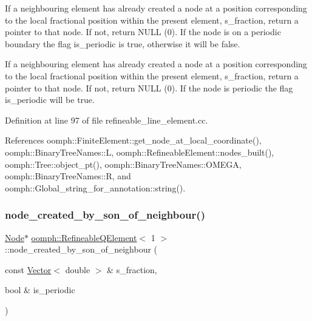 If a neighbouring element has already created a node at a position corresponding to the local fractional position within the present element, s\+\_\+fraction, return a pointer to that node. If not, return N\+U\+LL (0). If the node is on a periodic boundary the flag is\+\_\+periodic is true, otherwise it will be false. 

If a neighbouring element has already created a node at a position corresponding to the local fractional position within the present element, s\+\_\+fraction, return a pointer to that node. If not, return N\+U\+LL (0). If the node is periodic the flag is\+\_\+periodic will be true. 

Definition at line 97 of file refineable\+\_\+line\+\_\+element.\+cc.



References oomph\+::\+Finite\+Element\+::get\+\_\+node\+\_\+at\+\_\+local\+\_\+coordinate(), oomph\+::\+Binary\+Tree\+Names\+::L, oomph\+::\+Refineable\+Element\+::nodes\+\_\+built(), oomph\+::\+Tree\+::object\+\_\+pt(), oomph\+::\+Binary\+Tree\+Names\+::\+O\+M\+E\+GA, oomph\+::\+Binary\+Tree\+Names\+::R, and oomph\+::\+Global\+\_\+string\+\_\+for\+\_\+annotation\+::string().

\mbox{\label{classoomph_1_1RefineableQElement_3_011_01_4_a0c1fee29155e53b1c03bac851080cbd0}} 
\subsubsection{\texorpdfstring{node\+\_\+created\+\_\+by\+\_\+son\+\_\+of\+\_\+neighbour()}{node\_created\_by\_son\_of\_neighbour()}}
{\footnotesize\ttfamily \hyperlink{classoomph_1_1Node}{Node}$\ast$ \hyperlink{classoomph_1_1RefineableQElement}{oomph\+::\+Refineable\+Q\+Element}$<$ 1 $>$\+::node\+\_\+created\+\_\+by\+\_\+son\+\_\+of\+\_\+neighbour (\begin{DoxyParamCaption}\item[{const \hyperlink{classoomph_1_1Vector}{Vector}$<$ double $>$ \&}]{s\+\_\+fraction,  }\item[{bool \&}]{is\+\_\+periodic }\end{DoxyParamCaption})\hspace{0.3cm}{\ttfamily [inline]}}



